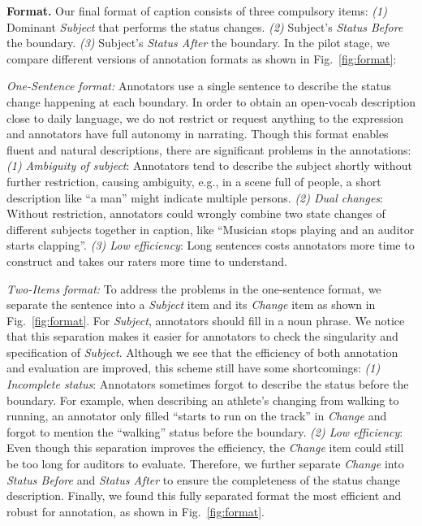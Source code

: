 \documentclass[runningheads]{llncs}
\begin{document}
\textbf{Format.}
Our final format of caption consists of three compulsory items: \textit{(1)} Dominant \textit{Subject} that performs the status changes. \textit{(2)} Subject's \textit{Status Before} the boundary. \textit{(3)} Subject's \textit{Status After} the boundary. In the pilot stage, we compare different versions of annotation formats as shown in Fig.~\ref{fig:format}:

\textit{One-Sentence format:} Annotators use a single sentence to describe the status change happening at each boundary. In order to obtain an open-vocab description close to daily language, we do not restrict or request anything to the expression and annotators have full autonomy in narrating. Though this format enables fluent and natural descriptions, there are significant problems in the annotations: 
\textit{(1) Ambiguity of subject}: Annotators tend to describe the subject shortly without further restriction, causing ambiguity, e.g., in a scene full of people, a short description like “a man” might indicate multiple persons.
\textit{(2) Dual changes}: Without restriction, annotators could wrongly combine two state changes of different subjects together in caption, like “Musician stops playing and an auditor starts clapping”. 
\textit{(3) Low efficiency}: Long sentences costs annotators more time to construct and takes our raters more time to understand.


\textit{Two-Items format:} To address the problems in the one-sentence format, we separate the sentence into a \textit{Subject} item and its \textit{Change} item as shown in Fig.~\ref{fig:format}. For \textit{Subject}, annotators should fill in a noun phrase. We notice that this separation makes it easier for annotators to check the singularity and specification of \textit{Subject}. Although we see that the efficiency of both annotation and evaluation are improved, this scheme still have some shortcomings:
\textit{(1) Incomplete status}: Annotators sometimes forgot to describe the status before the boundary. For example, when describing an athlete’s changing from walking to running, an annotator only filled “starts to run on the track” in \textit{Change} and forgot to mention the “walking” status before the boundary.
\textit{(2) Low efficiency}: Even though this separation improves the efficiency, the \textit{Change} item could still be too long for auditors to evaluate.
Therefore, we further separate \textit{Change} into \textit{Status Before} and \textit{Status After} to ensure the completeness of the status change description. Finally, we found this fully separated format the most efficient and robust for annotation, as shown in Fig.~\ref{fig:format}.
\end{document}
